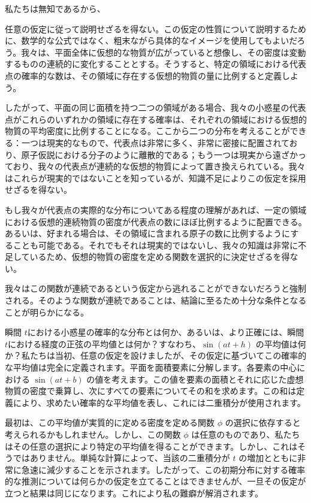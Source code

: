 \documentclass[a4paper,11pt,openany]{ltjsbook}
\begin{document}
私たちは無知であるから、



任意の仮定に従って説明せざるを得ない。この仮定の性質について説明するために、数学的な公式ではなく、粗末ながら具体的なイメージを使用してもよいだろう。我々は、平面全体に仮想的な物質が広がっていると想像し、その密度は変動するものの連続的に変化することとする。そうすると、特定の領域における代表点の確率的な数は、その領域に存在する仮想的物質の量に比例すると定義しよう。

したがって、平面の同じ面積を持つ二つの領域がある場合、我々の小惑星の代表点がこれらのいずれかの領域に存在する確率は、それぞれの領域における仮想的物質の平均密度に比例することになる。ここから二つの分布を考えることができる：一つは現実的なもので、代表点は非常に多く、非常に密接に配置されており、原子仮説における分子のように離散的である；もう一つは現実から遠ざかっており、我々の代表点が連続的な仮想的物質によって置き換えられている。我々はこれらが現実的ではないことを知っているが、知識不足によりこの仮定を採用せざるを得ない。

もし我々が代表点の実際的な分布についてある程度の理解があれば、一定の領域における仮想的連続物質の密度が代表点の数にほぼ比例するように配置できる。あるいは、好まれる場合は、その領域に含まれる原子の数に比例するようにすることも可能である。それでもそれは現実的ではないし、我々の知識は非常に不足しているため、仮想的物質の密度を定める関数を選択的に決定せざるを得ない。

我々はこの関数が連続であるという仮定から逃れることができないだろうと強制される。そのような関数が連続であることは、結論に至るため十分な条件となることが明らかになる。

瞬間 \( t \)における小惑星の確率的な分布とは何か、あるいは、より正確には、瞬間 \( t \)における経度の正弦の平均値とは何か？すなわち、\(\sin(at + h)\) の平均値は何か？私たちは当初、任意の仮定を設けましたが、その仮定に基づいてこの確率的な平均値は完全に定義されます。平面を面積要素に分解します。各要素の中心における \(\sin(at + b)\) の値を考えます。この値を要素の面積とそれに応じた虚想物質の密度で乗算し、次にすべての要素についてその和を求めます。この和は定義により、求めたい確率的な平均値を表し、これには二重積分が使用されます。

最初は、この平均値が実質的に定める密度を定める関数 \(\phi\) の選択に依存すると考えられるかもしれません。しかし、この関数 \(\phi\) は任意のものであり、私たちはその任意の選択により特定の平均値を得ることができます。しかし、これはそうではありません。単純な計算によって、当該の二重積分が \( t \) の増加とともに非常に急速に減少することを示されます。したがって、この初期分布に対する確率的な推測については何らかの仮定を立てることはできませんが、一旦その仮定が立つと結果は同じになります。これにより私の難癖が解消されます。
\end{document}

